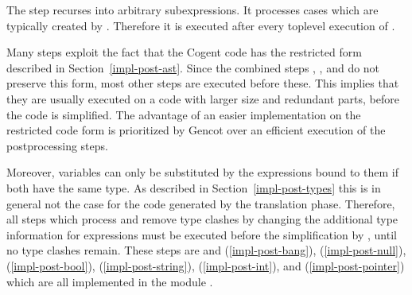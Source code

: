 The  step recurses into arbitrary subexpressions. It processes cases which are typically created by .
Therefore it is executed after every toplevel execution of .

Many steps exploit the fact that the Cogent code has the restricted form described in Section~\ref{impl-post-ast}. Since the combined
steps , , and  do not preserve this form, most other steps are executed before these. This
implies that they are usually executed on a code with larger size and redundant parts, before the code is simplified. The advantage
of an easier implementation on the restricted code form is prioritized by Gencot over an efficient execution of the postprocessing steps.

Moreover, variables can only be substituted by the expressions bound to them if both have the same type. As described in
Section~\ref{impl-post-types} this is in general not the case for the code generated by the translation phase. Therefore, all steps
which process and remove type clashes by changing the additional type information for expressions must be executed before the
simplification by , until no type clashes remain. These steps are  and  (\ref{impl-post-bang}),
 (\ref{impl-post-null}),  (\ref{impl-post-bool}),  (\ref{impl-post-string}),
 (\ref{impl-post-int}), and  (\ref{impl-post-pointer}) which are all implemented in the module
.

